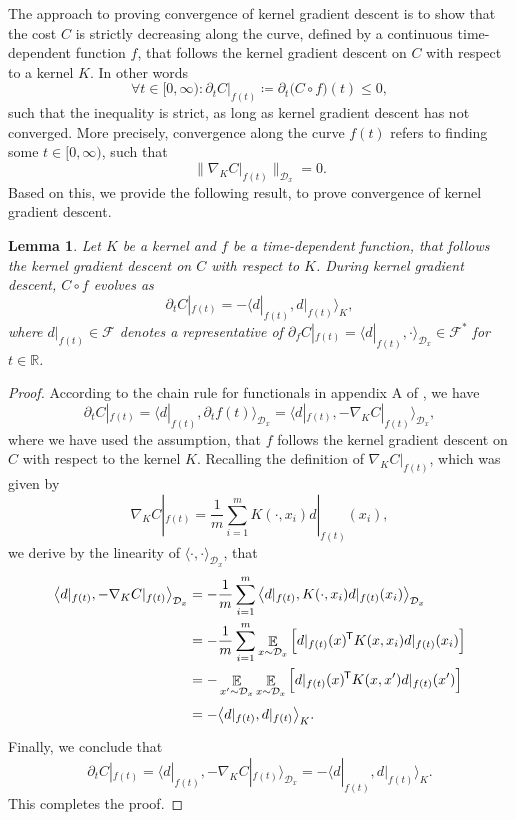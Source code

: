 \documentclass[11pt, a4paper]{article}
\newtheorem{lemma}[theorem]{Lemma}
\newcommand{\R}{\mathbb{R}}
\newcommand{\D}{\mathcal{D}}
\newcommand{\F}{\mathcal{F}}
\newcommand*{\tr}{^{\mkern-1.5mu\mathsf{T}}}
\DeclareMathOperator*{\E}{\mathbb{E}}
\begin{document}
The approach to proving convergence of kernel gradient descent is to show that the cost $C$ is strictly decreasing along the curve, defined by a continuous time-dependent function $f$, that follows the kernel gradient descent on $C$ with respect to a kernel $K$. In other words
\[ \forall t \in [0,\infty) : \partial_tC|_{f(t)} \coloneq \partial_t \big ( C \circ f \big )(t) \leq 0, \]
such that the inequality is strict, as long as kernel gradient descent has not converged. More precisely, convergence along the curve $f(t)$ refers to finding some $t \in [0, \infty)$, such that
\[ \big \| \nabla_K C |_{f(t)}\big \|_{\D_x} = 0. \]
Based on this, we provide the following result, to prove convergence of kernel gradient descent.

\begin{lemma}
Let $K$ be a kernel and $f$ be a time-dependent function, that follows the kernel gradient descent on $C$ with respect to $K$. During kernel gradient descent, $C \circ f$ evolves as 
\[ \partial_tC|_{f(t)} = - \big \langle d|_{f(t)}, d|_{f(t)} \big \rangle_{K}, \]
where $d|_{f(t)} \in \F$ denotes a representative of $\partial_f C|_{f(t)} = \big \langle d|_{f(t)}, \cdot \big \rangle_{\D_x} \in \F^*$ for $t \in \R$.
\end{lemma}

\begin{proof}
According to the chain rule for functionals in appendix A of \cite{Functionals}, we have
\[ \partial_tC|_{f(t)} = \big \langle d|_{f(t)}, \partial_t f(t) \big \rangle_{\D_x} = \big \langle d|_{f(t)}, - \nabla_K C|_{f(t)} \big \rangle_{\D_x}, \]
where we have used the assumption, that $f$ follows the kernel gradient descent on $C$ with respect to the kernel $K$.
Recalling the definition of $\nabla_K C|_{f(t)}$, which was given by
\[ \nabla_KC|_{f(t)} = \frac{1}{m} \sum_{i=1}^{m} K(\cdot,x_i)d|_{f(t)}(x_i), \]
we derive by the linearity of $\langle \cdot, \cdot \rangle_{\D_x}$, that
\[ \begin{split} 
\big \langle d|_{f(t)}, - \nabla_K C|_{f(t)} \big \rangle_{\D_x} 
&= - \frac{1}{m} \sum_{i=1}^{m} \big \langle d|_{f(t)}, K(\cdot,x_i)d|_{f(t)}(x_i) \big \rangle_{\D_x} \\\
&= - \frac{1}{m} \sum_{i=1}^{m} \E_{x \sim \D_x} \Big [ d|_{f(t)}(x)\tr K(x,x_i)d|_{f(t)}(x_i) \Big ] \\\
&= - \E_{x' \sim \D_x} \E_{x \sim \D_x} \Big [ d|_{f(t)}(x)\tr K(x,x')d|_{f(t)}(x') \Big ] \\\
\textcolor{white}{\Big |}&= - \big \langle d|_{f(t)}, d|_{f(t)} \big \rangle_{K}.
\end{split} \]
Finally, we conclude that
\[ \partial_tC|_{f(t)} = \big \langle d|_{f(t)}, - \nabla_K C|_{f(t)} \big \rangle_{\D_x} = - \big \langle d|_{f(t)}, d|_{f(t)} \big \rangle_{K}. \]
This completes the proof.
\end{proof}
\end{document}

